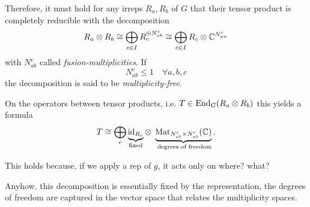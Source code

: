 Therefore, it must hold for any irreps $R_a,R_b$ of $G$ that their tensor
product is completely reducible with the decomposition
\[
  R_a \otimes R_b 
  \cong
  \bigoplus_{c \in I} R_c^{\oplus N_{ab}^c}
  \cong
  \bigoplus_{c \in I} R_c \otimes \mathbb{C}^{N_{an}^c}
\]
with $N_{ab}^c$ called \emph{fusion-multiplicities}. If
\begin{equation}\label{sym:eq:multiplicityFree}
  N_{ab}^c \leq 1 \quad \forall a,b,c 
\end{equation}
the decomposition is said to be \emph{multiplicity-free}.

On the operators between tensor products, i.e. $T \in \operatorname{End}_G(R_a \otimes R_b)$
this yields a formula
\begin{equation}\label{sym:eq:operatordecomp}
  T 
  \cong 
  \bigoplus_c 
  \underbrace{\operatorname{id}_{R_c}}_{\text{fixed}} 
  \otimes \; 
  \underbrace{\mathrm{Mat}_{N_{ab}^c \times N_{ab}^c}(\mathbb{C})}_{\text{ degrees of freedom}}. 
\end{equation}

This holds because, if we apply a rep of $g$, it acts only on where? what?

Anyhow, this decomposition is essentially fixed by the representation, the
degrees of freedom are captured in the vector space that relates the
multiplicity spaces.



